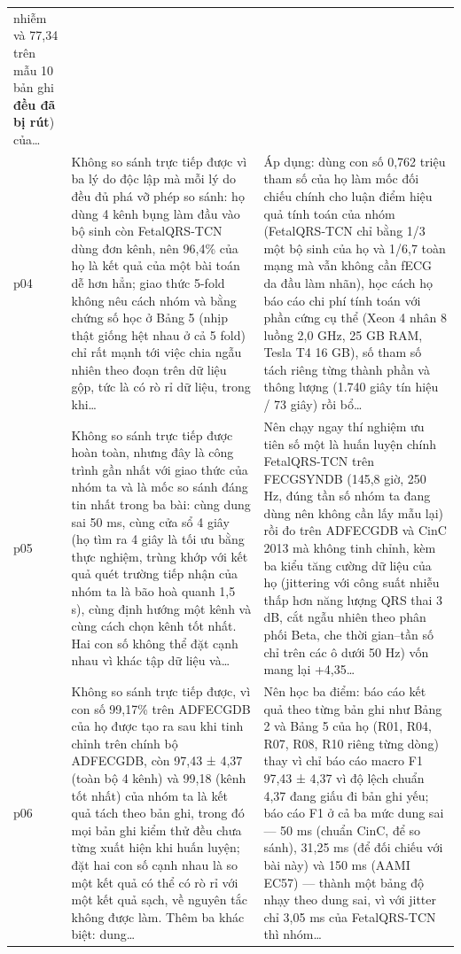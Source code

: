 \begin{longtable}{@{}L{1.05cm} L{6.0cm} L{7.2cm}@{}}
{nhiễm và 77,34 trên mẫu 10 bản ghi \textbf{đều đã bị rút}) của…} \\[2pt]
p04 & {\scriptsize Không so sánh trực tiếp được vì ba lý do độc lập mà mỗi lý do đều đủ phá vỡ phép so sánh: họ dùng 4 kênh bụng làm đầu vào bộ sinh còn FetalQRS-TCN dùng đơn kênh, nên 96,4\% của họ là kết quả của một bài toán dễ hơn hẳn; giao thức 5-fold không nêu cách nhóm và bằng chứng số học ở Bảng 5 (nhịp thật giống hệt nhau ở cả 5 fold) chỉ rất mạnh tới việc chia ngẫu nhiên theo đoạn trên dữ liệu gộp, tức là có rò rỉ dữ liệu, trong khi…} & {\scriptsize Áp dụng: dùng con số 0,762 triệu tham số của họ làm mốc đối chiếu chính cho luận điểm hiệu quả tính toán của nhóm (FetalQRS-TCN chỉ bằng 1/3 một bộ sinh của họ và 1/6,7 toàn mạng mà vẫn không cần fECG da đầu làm nhãn), học cách họ báo cáo chi phí tính toán với phần cứng cụ thể (Xeon 4 nhân 8 luồng 2,0 GHz, 25 GB RAM, Tesla T4 16 GB), số tham số tách riêng từng thành phần và thông lượng (1.740 giây tín hiệu / 73 giây) rồi bổ…} \\[2pt]
p05 & {\scriptsize Không so sánh trực tiếp được hoàn toàn, nhưng đây là công trình gần nhất với giao thức của nhóm ta và là mốc so sánh đáng tin nhất trong ba bài: cùng dung sai 50 ms, cùng cửa sổ 4 giây (họ tìm ra 4 giây là tối ưu bằng thực nghiệm, trùng khớp với kết quả quét trường tiếp nhận của nhóm ta là bão hoà quanh 1,5 s), cùng định hướng một kênh và cùng cách chọn kênh tốt nhất. Hai con số không thể đặt cạnh nhau vì khác tập dữ liệu và…} & {\scriptsize Nên chạy ngay thí nghiệm ưu tiên số một là huấn luyện chính FetalQRS-TCN trên FECGSYNDB (145,8 giờ, 250 Hz, đúng tần số nhóm ta đang dùng nên không cần lấy mẫu lại) rồi đo trên ADFECGDB và CinC 2013 mà không tinh chỉnh, kèm ba kiểu tăng cường dữ liệu của họ (jittering với công suất nhiễu thấp hơn năng lượng QRS thai 3 dB, cắt ngẫu nhiên theo phân phối Beta, che thời gian–tần số chỉ trên các ô dưới 50 Hz) vốn mang lại +4,35…} \\[2pt]
p06 & {\scriptsize Không so sánh trực tiếp được, vì con số 99,17\% trên ADFECGDB của họ được tạo ra sau khi tinh chỉnh trên chính bộ ADFECGDB, còn 97,43 ± 4,37 (toàn bộ 4 kênh) và 99,18 (kênh tốt nhất) của nhóm ta là kết quả tách theo bản ghi, trong đó mọi bản ghi kiểm thử đều chưa từng xuất hiện khi huấn luyện; đặt hai con số cạnh nhau là so một kết quả có thể có rò rỉ với một kết quả sạch, về nguyên tắc không được làm. Thêm ba khác biệt: dung…} & {\scriptsize Nên học ba điểm: báo cáo kết quả theo từng bản ghi như Bảng 2 và Bảng 5 của họ (R01, R04, R07, R08, R10 riêng từng dòng) thay vì chỉ báo cáo macro F1 97,43 ± 4,37 vì độ lệch chuẩn 4,37 đang giấu đi bản ghi yếu; báo cáo F1 ở cả ba mức dung sai — 50 ms (chuẩn CinC, để so sánh), 31,25 ms (để đối chiếu với bài này) và 150 ms (AAMI EC57) — thành một bảng độ nhạy theo dung sai, vì với jitter chỉ 3,05 ms của FetalQRS-TCN thì nhóm…} \\[2pt]

\end{longtable}
